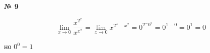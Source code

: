 \documentclass{article}
\begin{document}
\textbf{№ 9} 

\begingroup

$$ \lim\limits_{x\to 0} \frac{x^{2^x}}{x^{x^2}} 
=  \lim\limits_{x\to 0} x^{2^x-x^2} 
= 0^{2^-0^2} 
= 0^{1-0}
= 0^1
= 0$$

но $0^0 = 1$

\endgroup
\end{document}
